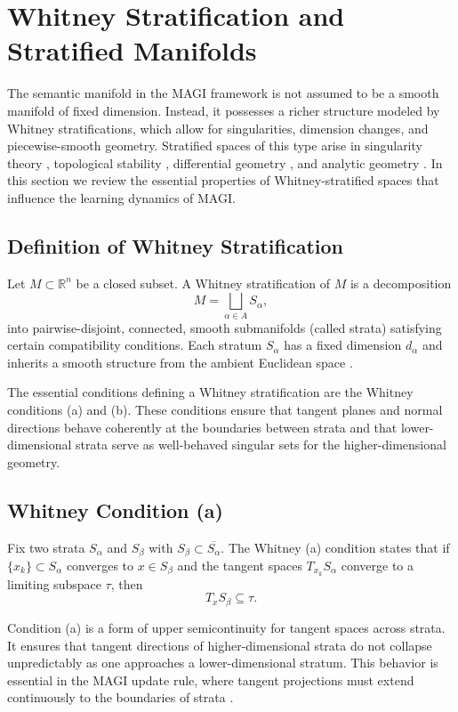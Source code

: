 \documentclass[12pt]{article}
\begin{document}
\section{Whitney Stratification and Stratified Manifolds}

The semantic manifold in the MAGI framework is not assumed to be a smooth manifold of fixed dimension. Instead, it possesses a richer structure modeled by Whitney stratifications, which allow for singularities, dimension changes, and piecewise-smooth geometry. Stratified spaces of this type arise in singularity theory \citep{Whitney1965,Thom1969}, topological stability \citep{Mather1970}, differential geometry \citep{Chillingworth1976}, and analytic geometry \citep{BierstoneMilman1988,Pflaum2000}. In this section we review the essential properties of Whitney-stratified spaces that influence the learning dynamics of MAGI.

\subsection*{Definition of Whitney Stratification}

Let $M \subset \mathbb{R}^n$ be a closed subset. A Whitney stratification of $M$ is a decomposition
\[
M = \bigsqcup_{\alpha \in A} S_\alpha,
\]
into pairwise-disjoint, connected, smooth submanifolds (called strata) satisfying certain compatibility conditions. Each stratum $S_\alpha$ has a fixed dimension $d_\alpha$ and inherits a smooth structure from the ambient Euclidean space \citep{Whitney1957,GuilleminPollack1974}.

The essential conditions defining a Whitney stratification are the Whitney conditions (a) and (b). These conditions ensure that tangent planes and normal directions behave coherently at the boundaries between strata and that lower-dimensional strata serve as well-behaved singular sets for the higher-dimensional geometry.

\subsection*{Whitney Condition (a)}

Fix two strata $S_\alpha$ and $S_\beta$ with $S_\beta \subset \overline{S_\alpha}$. The Whitney (a) condition states that if $\{x_k\}\subset S_\alpha$ converges to $x\in S_\beta$ and the tangent spaces $T_{x_k}S_\alpha$ converge to a limiting subspace $\tau$, then
\[
T_x S_\beta \subseteq \tau.
\]

Condition (a) is a form of upper semicontinuity for tangent spaces across strata. It ensures that tangent directions of higher-dimensional strata do not collapse unpredictably as one approaches a lower-dimensional stratum. This behavior is essential in the MAGI update rule, where tangent projections must extend continuously to the boundaries of strata \citep{Whitney1965,Chillingworth1976}.
\end{document}
